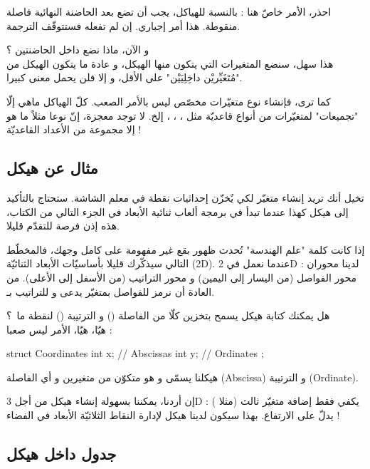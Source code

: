 \begin{critical}
  احذر، الأمر خاصّ هنا : بالنسبة للهياكل، يجب أن تضع بعد الحاضنة النهائية فاصلة منقوطة. هذا أمر إجباري. إن لم تفعله فستتوقّف الترجمة.
\end{critical}
و الآن، ماذا نضع داخل الحاضنتين ؟\\
هذا سهل، سنضع المتغيرات التي يتكون منها الهيكل، و عادة ما يتكون الهيكل من "مُتَغَيِّريْن داخِلِيَيْن" على الأقل، و إلا فلن يحمل معنى كبيرا.

كما ترى، فإنشاء نوع متغيّرات مخصّص ليس بالأمر الصعب. كلّ الهياكل ماهي إلّا "تجميعات" لمتغيّرات من أنواع قاعديّة مثل
، ، ،
إلخ. لا توجد معجزة، إنّ نوعا
مثلاً ما هو إلا مجموعة من الأعداد القاعديّة !

\subsection{مثال عن هيكل}
تخيل أنك تريد إنشاء متغيّر لكي يٌخزّن إحداثيات نقطة في معلم الشاشة. ستحتاج بالتأكيد إلى هيكل كهذا عندما تبدأ في برمجة ألعاب ثنائية الأبعاد في الجزء التالي من الكتاب، هذه إذن فرصة للتقدّم قليلا.

إذا كانت كلمة "علم الهندسة" تُحدث ظهور بقع غير مفهومة على كامل وجهك، فالمخطّط التالي سيذكّرك قليلا بأساسيّات الأبعاد الثنائيّة (\textenglish{2D}).
عندما نعمل في
\textenglish{2D}
لدينا محوران : محور الفواصل (من اليسار إلى اليمين) و محور التراتيب (من الأسفل إلى الأعلى). من العادة أن نرمز للفواصل بمتغيّر يدعى
و للتراتيب بـ.

هل يمكنك كتابة هيكل
يسمح بتخزين كلّا من الفاصلة
()
و الترتيبة
()
لنقطة ما~؟\\
هيّا، هيّا، الأمر ليس صعبا :

\begin{Csource}
struct Coordinates
{
	int x; // Abscissas
	int y; // Ordinates
};
\end{Csource}

هيكلنا يسمّى
و هو متكوّن من متغيرين
و
أي الفاصلة
(\textenglish{Abscissa})
و الترتيبة
(\textenglish{Ordinate}).

إن أردنا، يمكننا بسهولة إنشاء هيكل
من أجل
\textenglish{3D} :
يكفي فقط إضافة متغيّر ثالث (مثلا
)
يدلّ على الارتفاع. بهذا سيكون لدينا هيكل لإدارة النقاط الثلاثيّة الأبعاد في الفضاء !

\subsection{جدول داخل هيكل}

